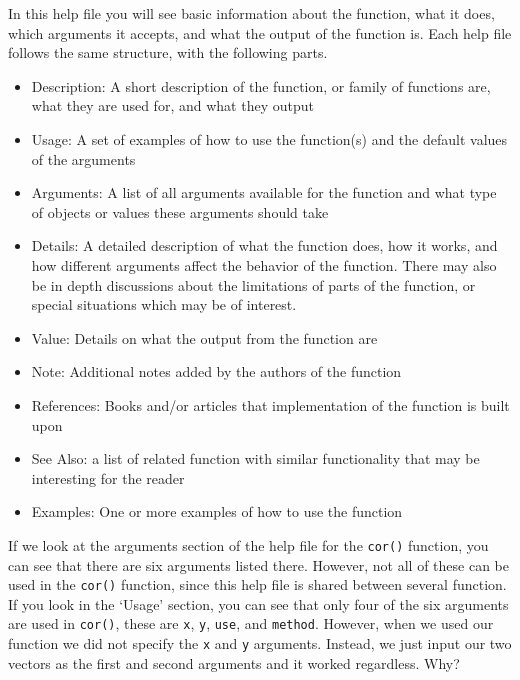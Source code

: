 \documentclass[
]{book}
\providecommand{\tightlist}{%
  \setlength{\itemsep}{0pt}\setlength{\parskip}{0pt}}
\begin{document}
In this help file you will see basic information about the function, what it does, which arguments it accepts, and what the output of the function is. Each help file follows the same structure, with the following parts.

\begin{itemize}
\tightlist
\item
  Description: A short description of the function, or family of functions are, what they are used for, and what they output
\item
  Usage: A set of examples of how to use the function(s) and the default values of the arguments
\item
  Arguments: A list of all arguments available for the function and what type of objects or values these arguments should take
\item
  Details: A detailed description of what the function does, how it works, and how different arguments affect the behavior of the function. There may also be in depth discussions about the limitations of parts of the function, or special situations which may be of interest.
\item
  Value: Details on what the output from the function are
\item
  Note: Additional notes added by the authors of the function
\item
  References: Books and/or articles that implementation of the function is built upon
\item
  See Also: a list of related function with similar functionality that may be interesting for the reader
\item
  Examples: One or more examples of how to use the function
\end{itemize}

If we look at the arguments section of the help file for the \texttt{cor()} function, you can see that there are six arguments listed there. However, not all of these can be used in the \texttt{cor()} function, since this help file is shared between several function. If you look in the `Usage' section, you can see that only four of the six arguments are used in \texttt{cor()}, these are \texttt{x}, \texttt{y}, \texttt{use}, and \texttt{method}. However, when we used our function we did not specify the \texttt{x} and \texttt{y} arguments. Instead, we just input our two vectors as the first and second arguments and it worked regardless. Why?
\end{document}
